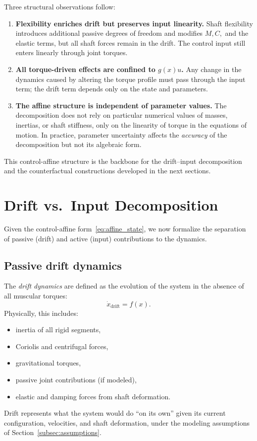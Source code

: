 \documentclass[12pt]{article}
\newcommand{\xd}{\dot{x}}
\begin{document}
Three structural observations follow:
\begin{enumerate}
  \item \textbf{Flexibility enriches drift but preserves input linearity.} Shaft flexibility introduces additional passive degrees of freedom and modifies \(M, C,\) and the elastic terms, but all shaft forces remain in the drift. The control input still enters linearly through joint torques.
  \item \textbf{All torque-driven effects are confined to \(g(x)u\).} Any change in the dynamics caused by altering the torque profile must pass through the input term; the drift term depends only on the state and parameters.
  \item \textbf{The affine structure is independent of parameter values.} The decomposition does not rely on particular numerical values of masses, inertias, or shaft stiffness, only on the linearity of torque in the equations of motion. In practice, parameter uncertainty affects the \emph{accuracy} of the decomposition but not its algebraic form.
\end{enumerate}

This control-affine structure is the backbone for the drift--input decomposition and the counterfactual constructions developed in the next sections.

\section{Drift vs.\ Input Decomposition}
\label{sec:drift_input}

Given the control-affine form~\eqref{eq:affine_state}, we now formalize the separation of passive (drift) and active (input) contributions to the dynamics.

\subsection{Passive drift dynamics}

The \emph{drift dynamics} are defined as the evolution of the system in the absence of all muscular torques:
\begin{equation}
  \xd_{\text{drift}} = f(x).
\end{equation}
Physically, this includes:
\begin{itemize}
  \item inertia of all rigid segments,
  \item Coriolis and centrifugal forces,
  \item gravitational torques,
  \item passive joint contributions (if modeled),
  \item elastic and damping forces from shaft deformation.
\end{itemize}
Drift represents what the system would do ``on its own'' given its current configuration, velocities, and shaft deformation, under the modeling assumptions of Section~\ref{subsec:assumptions}.
\end{document}
